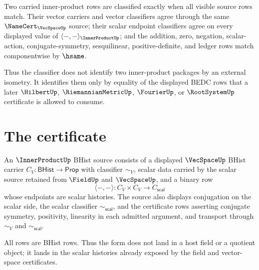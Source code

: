 \begin{definition}
\label{def:innerproduct-bhist-classifier}
Two carried inner-product rows are classified exactly when all visible source
rows match. Their vector carriers and vector classifiers agree through the
same $\NameCert_{\VecSpaceUp}$ source; their scalar endpoint classifiers agree
on every displayed value of $\langle-,-\rangle_{\InnerProductUp}$; and the
addition, zero, negation, scalar-action, conjugate-symmetry, sesquilinear,
positive-definite, and ledger rows match componentwise by $\hsame$.

Thus the classifier does not identify two inner-product packages by an
external isometry. It identifies them only by equality of the displayed BEDC
rows that a later $\HilbertUp$, $\RiemannianMetricUp$, $\FourierUp$, or
$\RootSystemUp$ certificate is allowed to consume.
\end{definition}

\section{The certificate}
\label{sec:innerproduct-certificate}

\begin{definition}
\label{def:innerproduct-bhist-source}
An $\InnerProductUp$ BHist source consists of a displayed $\VecSpaceUp$
BHist carrier $C_V:\mathsf{BHist}\to\mathsf{Prop}$ with classifier
$\sim_V$, scalar data carried by the scalar source retained from
$\FieldUp$ and $\VecSpaceUp$, and a binary row
$$
\langle-,-\rangle:C_V\times C_V\to C_{\mathsf{scal}}
$$
whose endpoints are scalar histories. The source also displays conjugation on
the scalar side, the scalar classifier $\sim_{\mathsf{scal}}$, and the
certificate rows asserting conjugate symmetry, positivity, linearity in each
admitted argument, and transport through $\sim_V$ and
$\sim_{\mathsf{scal}}$.

All rows are BHist rows. Thus the form does not land in a host field or a
quotient object; it lands in the scalar histories already exposed by the
field and vector-space certificates.
\end{definition}


